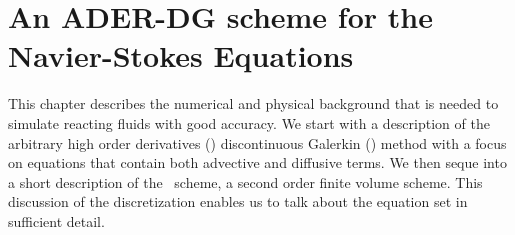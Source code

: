 
\newcommand{\Q}{\bm{Q}}
\newcommand{\gradQ}{\gradient{\Q}}
\newcommand{\Qrho}{\rho}
\newcommand{\Qj}{\rho \bm{v}}
\newcommand{\Qv}{\bm{v}}
\newcommand{\QE}{\rho E}
\newcommand{\QZZ}{Z} %
\newcommand{\QZ}{\rho \QZZ}
\newcommand{\potT}{\theta}
\newcommand{\backgroundPotT}{\overline{\theta}}
\newcommand{\pertubationPotT}{\theta'}
\newcommand{\stressT}{\bm{\sigma}}
\newcommand{\pressure}{p}
\newcommand{\maxConvEigen}[1][]{
  \vert%
  \lambda_c^{\text{max}}
  \notblank{#1}{\left(#1\right)}{}
  \vert%
}
\newcommand{\maxViscEigen}[1][]{
  \vert%
  \lambda_v^{\text{max}}
  \notblank{#1}{\left(#1\right)}{}
  \vert%
}
\newcommand{\Riemann}{\operatorname{Riemann}}

\newcommand{\domain}{\Omega}
\newcommand{\broken}{\domain}
\newcommand{\cell}[1][i]{C_{#1}}
\newcommand{\boundary}{\partial \domain}
\newcommand{\sbasis}[1][]{\Phi_{#1}}
\newcommand{\stbasis}[1][]{\Theta_{#1}}
\newcommand{\sbasisRef}[1][]{\hat{\sbasis[#1]}}
\newcommand{\stbasisRef}[1][]{\hat{\stbasis[#1]}}
\newcommand{\stestfunction}[1]{\sbasis[#1]}
\newcommand{\sttestfunction}[1]{\stbasis[#1]}
\newcommand{\normal}{\bm{n}}
\newcommand{\dsol}[1][h]{\bm{u}_{#1}}
\newcommand{\stpredictor}[1][h]{\bm{q}_{#1}}

\newcommand{\flux}{F}
\newcommand{\viscFlux}{\flux^{v}}
\newcommand{\hyperFlux}{\flux^{h}}
\newcommand{\source}[1][]{
  \notblank{#1}{
S_{#1}
}{
\bm{S}
}
}

\newcommand{\intdt}[1]{\int_{t^n}^{t^{n+1}} #1 \dd{t}}
\newcommand{\intdcell}[1]{\int_{\cell} #1 \dd{\bm{x}}}
\newcommand{\intdrefcell}[1]{\int_{\cell} #1 \dd{\hat{\bm{x}}}}
\newcommand{\intdcellb}[1]{\int_{\partial{} \cell} #1 \dd{S}} %
\newcommand{\intdrefcellb}[1]{\int_{\partial{} \cell} #1 \hat{\dd{S}}} %

\newcommand{\quadWeight}[1][i]{w_{#1}}

\chapter{An ADER-DG scheme for the Navier-Stokes Equations}\label{chap:methods}
This chapter describes the numerical and physical background that is needed to simulate reacting fluids with good accuracy.
We start with a description of the arbitrary high order derivatives (\ader) discontinuous Galerkin (\dg) method with a focus on equations that contain both advective and diffusive terms.
We then seque into a short description of the \muscl\ scheme, a second order finite volume scheme.
This discussion of the discretization enables us to talk about the equation set in sufficient detail.

